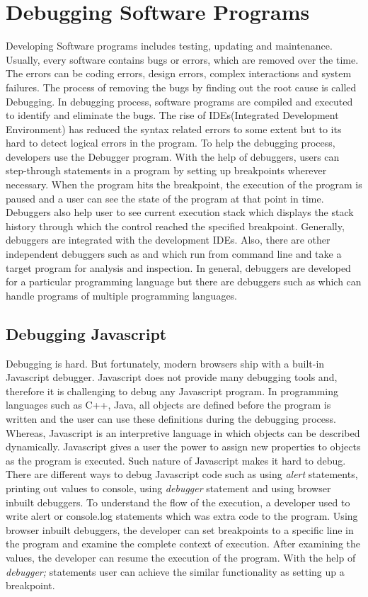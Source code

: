 \section{Debugging Software Programs}
Developing Software programs includes testing, updating and maintenance. Usually, every software contains bugs or errors, which are removed over the time. The errors can be coding errors, design errors, complex interactions and system failures. The process of removing the bugs by finding out the root cause is called Debugging. In debugging process, software programs are compiled and executed to identify and eliminate the bugs. The rise of IDEs(Integrated Development Environment) has reduced the syntax related errors to some extent but to its hard to detect logical errors in the program. To help the debugging process, developers use the Debugger program. With the help of debuggers, users can step-through statements in a program by setting up breakpoints wherever necessary. When the program hits the breakpoint, the execution of the program is paused and a user can see the state of the program at that point in time. Debuggers also help user to see current execution stack which displays the stack history through which the control reached the specified breakpoint. Generally, debuggers are integrated with the development IDEs. Also, there are other independent debuggers such as \cite{oracleDebugger} and \cite{gnuDebugger} which run from command line and take a target program for analysis and inspection. In general, debuggers are developed for a particular programming language but there are debuggers such as \cite{gnuDebugger} which can handle programs of multiple programming languages.

\subsection{Debugging Javascript}
Debugging is hard. But fortunately, modern browsers ship with a built-in Javascript debugger. Javascript does not provide many debugging tools and, therefore it is challenging to debug any Javascript program. In programming languages such as C++, Java, all objects are defined before the program is written and the user can use these definitions during the debugging process\cite{hoffman2000data}. Whereas, Javascript is an interpretive language in which objects can be described dynamically. Javascript gives a user the power to assign new properties to objects as the program is executed. Such nature of Javascript makes it hard to debug. There are different ways to debug Javascript code such as using \textit{alert} statements, printing out values to console, using \textit{debugger} statement and using browser inbuilt debuggers. To understand the flow of the execution, a developer used to write alert or console.log statements which was extra code to the program. Using browser inbuilt debuggers, the developer can set breakpoints to a specific line in the program and examine the complete context of execution. After examining the values, the developer can resume the execution of the program. With the help of \textit{debugger;} statements user can achieve the similar functionality as setting up a breakpoint. 

